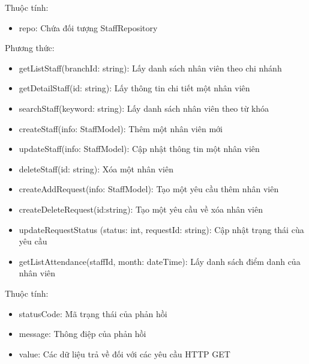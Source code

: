 Thuộc tính:
\begin{itemize}
	\item repo: Chứa đối tượng StaffRepository
\end{itemize}
Phương thức:
\begin{itemize}
	\item getListStaff(branchId: string): Lấy danh sách nhân viên theo chi nhánh
	\item getDetailStaff(id: string): Lấy thông tin chi tiết một nhân viên
	\item searchStaff(keyword: string): Lấy danh sách nhân viên theo từ khóa
	\item createStaff(info: StaffModel): Thêm một nhân viên mới
	\item updateStaff(info: StaffModel): Cập nhật thông tin một nhân viên
	\item deleteStaff(id: string): Xóa một nhân viên
	\item createAddRequest(info: StaffModel): Tạo một yêu cầu thêm nhân viên
	\item createDeleteRequest(id:string): Tạo một yêu cầu về xóa nhân viên
	\item updateRequestStatus (status: int, requestId: string): Cập nhật trạng thái cùa yêu cầu
	\item getListAttendance(staffId, month: dateTime): Lấy danh sách điểm danh của nhân viên
\end{itemize}

Thuộc tính:
\begin{itemize}
	\item statusCode: Mã trạng thái của phản hồi
	\item message: Thông điệp của phản hồi
	\item value: Các dữ liệu trả về đối với các yêu cầu HTTP GET
\end{itemize}



